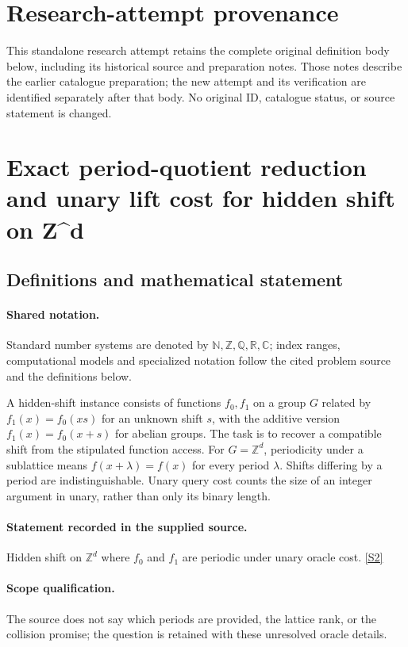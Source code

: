 \documentclass[11pt]{article}
\begin{document}
\section*{Research-attempt provenance}
This standalone research attempt retains the complete original definition body below,
including its historical source and preparation notes. Those notes describe the
earlier catalogue preparation; the new attempt and its verification are identified
separately after that body. No original ID, catalogue status, or source statement is changed.

\section{Exact period-quotient reduction and unary lift cost for hidden shift on Z\textasciicircum{}d}\label{statement}

\subsection{Definitions and mathematical statement}

\paragraph{Shared notation.}Standard number systems are denoted by $\mathbb N,\mathbb Z,\mathbb Q,\mathbb R,\mathbb C$; index ranges, computational models and specialized notation follow the cited problem source and the definitions below.


A hidden-shift instance consists of functions $f_0,f_1$ on a group $G$ related by $f_1(x)=f_0(xs)$ for an unknown shift $s$, with the additive version $f_1(x)=f_0(x+s)$ for abelian groups. The task is to recover a compatible shift from the stipulated function access. For $G=\mathbb Z^d$, periodicity under a sublattice means $f(x+\lambda)=f(x)$ for every period $\lambda$. Shifts differing by a period are indistinguishable. Unary query cost counts the size of an integer argument in unary, rather than only its binary length.
\paragraph{Statement recorded in the supplied source.}
Hidden shift on $\mathbb Z^d$ where $f_0$ and $f_1$ are periodic under unary oracle cost. \href{http://aimpl.org/quantumalg/4/}{[S2]}
\paragraph{Scope qualification.}
The source does not say which periods are provided, the lattice rank, or the collision promise; the question is retained with these unresolved oracle details.
\end{document}

